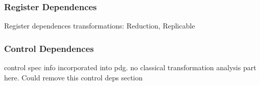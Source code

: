 



%
%
%


\subsubsection{Register Dependences}

Register dependences transformations:
Reduction,
Replicable

\subsubsection{Control Dependences}

control spec info incorporated into pdg. no classical transformation analysis
part here. Could remove this control deps section


